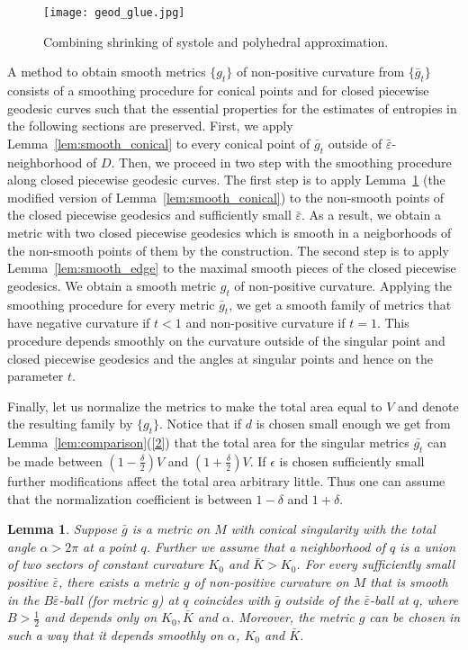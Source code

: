 \documentclass[12pt]{article}
\numberwithin{equation}{section}
\newtheorem{lem}{Lemma}[section]
\theoremstyle{definition}
\newcommand{\eps}{\varepsilon}
\begin{document}
 \begin{figure}
      \centering
      \texttt{[image: geod\_glue.jpg]}
      \caption{Combining shrinking of systole and polyhedral approximation.}
      \label{piecewise}
      \end{figure}

A method to obtain smooth metrics $\{g_t\}$ of non-positive curvature from $\{\bar g_t\}$ consists of a smoothing procedure for conical points and for closed piecewise geodesic curves such that the essential properties for the estimates of entropies in the following sections are preserved. First, we apply Lemma~\ref{lem:smooth_conical} to every conical point of $\bar g_t$ outside of $\bar\eps$-neighborhood of $D$.
Then, we proceed in two step with the smoothing procedure along closed piecewise geodesic curves. The first step is to apply Lemma~\ref{lem:smooth_conical_2} (the modified version of Lemma~\ref{lem:smooth_conical}) to the non-smooth points of the closed piecewise geodesics and sufficiently small $\bar\eps$. As a result, we obtain a metric with two closed piecewise geodesics which is smooth in a neigborhoods of the non-smooth points of them by the construction. The second step is to apply Lemma~\ref{lem:smooth_edge} to the maximal smooth pieces of the closed piecewise geodesics. We obtain a smooth metric $g_t$ of non-positive curvature. Applying the smoothing procedure for every metric $\bar g_t$, we get a smooth family of metrics that have negative curvature if $t<1$ and non-positive curvature if $t=1$. This procedure depends smoothly on the curvature outside of the singular point and closed piecewise geodesics and the angles at singular points and hence on the parameter $t$.

Finally, let us normalize  the metrics to make the total area equal to $V$ and denote the resulting family by $\{g_t\}$. Notice that if $d$ is chosen  small enough we get from Lemma~\ref{lem:comparison}(\ref{2})  that the total area for the singular metrics $\bar{g_t}$  can be made  between $(1-\frac{\delta}{2})V$ and $(1+\frac{\delta}{2})V$.  If  $\epsilon$ is chosen  sufficiently small further modifications affect the total area arbitrary little. Thus one can assume that the normalization coefficient is between $1-\delta$ and $1+\delta$. 


\begin{lem}\label{lem:smooth_conical_2}
Suppose $\bar g$ is a metric on $M$ with conical singularity with the total angle $\alpha>2\pi$ at a point $q$. Further we assume that a neighborhood of $q$ is a union of two sectors of constant curvature $K_0$ and $\bar K>K_0$. For every sufficiently small positive $\bar\eps$, there exists a metric $g$ of non-positive curvature on $M$ that is smooth in the $B\bar\eps$-ball (for metric $g$) at $q$ coincides with $\bar g$ outside of the $\bar \eps$-ball at $q$, where $B>\frac{1}{2}$ and depends only on $K_0, \bar K$ and $\alpha$. Moreover, the metric $g$ can be chosen in such a way that it depends smoothly on $\alpha$, $K_0$ and $\bar K$.
\end{lem}
\end{document}
